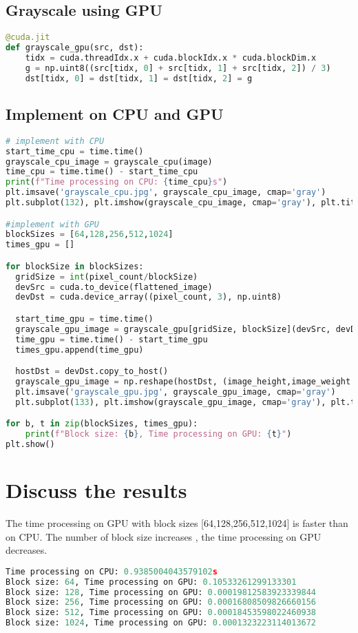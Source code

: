 \documentclass[12pt]{article}
\begin{document}
\subsection{Grayscale using GPU}
\begin{lstlisting}[language=Python]
@cuda.jit
def grayscale_gpu(src, dst):
    tidx = cuda.threadIdx.x + cuda.blockIdx.x * cuda.blockDim.x
    g = np.uint8((src[tidx, 0] + src[tidx, 1] + src[tidx, 2]) / 3)
    dst[tidx, 0] = dst[tidx, 1] = dst[tidx, 2] = g
\end{lstlisting}
\subsection{Implement on CPU and GPU}
\begin{lstlisting}[language=Python]
# implement with CPU
start_time_cpu = time.time()
grayscale_cpu_image = grayscale_cpu(image)
time_cpu = time.time() - start_time_cpu
print(f"Time processing on CPU: {time_cpu}s")
plt.imsave('grayscale_cpu.jpg', grayscale_cpu_image, cmap='gray')
plt.subplot(132), plt.imshow(grayscale_cpu_image, cmap='gray'), plt.title('Grayscale (CPU)')

#implement with GPU
blockSizes = [64,128,256,512,1024]
times_gpu = []

for blockSize in blockSizes:
  gridSize = int(pixel_count/blockSize)
  devSrc = cuda.to_device(flattened_image)
  devDst = cuda.device_array((pixel_count, 3), np.uint8)

  start_time_gpu = time.time()
  grayscale_gpu_image = grayscale_gpu[gridSize, blockSize](devSrc, devDst)
  time_gpu = time.time() - start_time_gpu
  times_gpu.append(time_gpu)

  hostDst = devDst.copy_to_host()
  grayscale_gpu_image = np.reshape(hostDst, (image_height,image_weight ,3))
  plt.imsave('grayscale_gpu.jpg', grayscale_gpu_image, cmap='gray')
  plt.subplot(133), plt.imshow(grayscale_gpu_image, cmap='gray'), plt.title('Grayscale (GPU)')

for b, t in zip(blockSizes, times_gpu):
    print(f"Block size: {b}, Time processing on GPU: {t}")
plt.show()
\end{lstlisting}
\section{Discuss the results}
The time processing on GPU with block sizes [64,128,256,512,1024] is faster than on CPU.
The number of block size increases , the time processing on GPU decreases.
\begin{lstlisting}[language=Python]
Time processing on CPU: 0.9385004043579102s
Block size: 64, Time processing on GPU: 0.10533261299133301
Block size: 128, Time processing on GPU: 0.00019812583923339844
Block size: 256, Time processing on GPU: 0.00016808509826660156
Block size: 512, Time processing on GPU: 0.00018453598022460938
Block size: 1024, Time processing on GPU: 0.0001323223114013672
\end{lstlisting}
\end{document}
